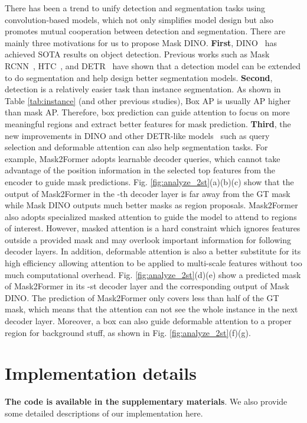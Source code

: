 \documentclass[10pt,twocolumn,letterpaper]{article}
\begin{document}
 There has been a trend to unify detection and segmentation tasks using convolution-based models, which not only simplifies model design but also promotes mutual cooperation between detection and segmentation. There are mainly three motivations for us to propose Mask DINO. \textbf{First}, DINO~\cite{zhang2022dino} has achieved SOTA results on object detection. Previous works such as Mask RCNN~\cite{he2017mask}, HTC~\cite{chen2019hybrid}, and DETR~\cite{carion2020end} have shown that a detection model can be extended to do segmentation and help design better segmentation models. 
\textbf{Second}, detection is a relatively easier task than instance segmentation. As shown in Table   \ref{tab:instance} (and other previous studies), Box AP is usually  AP higher than mask AP. Therefore, box prediction can guide attention to focus on more meaningful regions and extract better features for mask prediction. \textbf{Third}, the new improvements in DINO and other DETR-like models~\cite{zhu2020deformable,li2022dn} such as query selection and deformable attention can also help segmentation tasks. For example, Mask2Former adopts learnable decoder queries, which cannot take advantage of the position information in the selected top  features from the encoder to guide mask predictions. Fig.   \ref{fig:analyze_2st}(a)(b)(c) show that the output of Mask2Former in the -th decoder layer is far away from the GT mask while Mask DINO outputs much better masks as region proposals. Mask2Former also adopts specialized masked attention to guide the model to attend to regions of interest. However, masked attention is a hard constraint which ignores features outside a provided mask and may overlook important information for following decoder layers. In addition, deformable attention is also a better substitute for its high efficiency allowing attention to be applied to multi-scale features without too much computational overhead. Fig.     \ref{fig:analyze_2st}(d)(e) show a predicted mask of Mask2Former in its -st decoder layer and the corresponding output of Mask DINO. The prediction of Mask2Former only covers less than half of the GT mask, which means that the attention can not see the whole instance in the next decoder layer. 
Moreover, a box can also guide deformable attention to a proper region for background stuff, as shown in Fig.   \ref{fig:analyze_2st}(f)(g).

\section{Implementation details}\label{sec:impl}
\textbf{The code is available in the supplementary materials}. We also provide some detailed descriptions of our implementation here.
\end{document}
